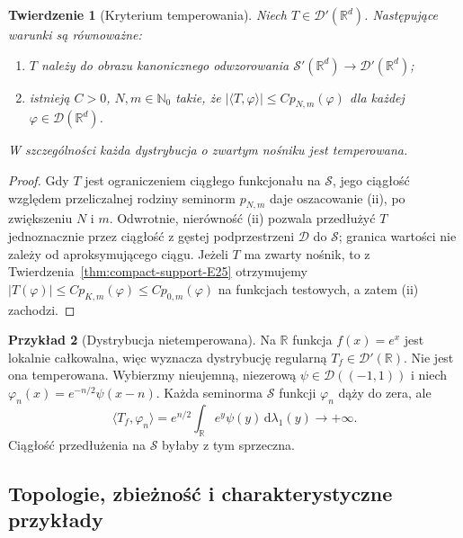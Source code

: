\documentclass[11pt,a4paper]{article}
\numberwithin{equation}{section}
\theoremstyle{plain}
\newtheorem{twierdzenie}{Twierdzenie}[section]
\theoremstyle{definition}
\newtheorem{przyklad}[twierdzenie]{Przykład}
\theoremstyle{remark}
\newcommand{\R}{\mathbb R}
\newcommand{\N}{\mathbb N}
\begin{document}
\begin{twierdzenie}[Kryterium temperowania]
\label{thm:temp-criterion25}
Niech $T\in\mathcal D'(\R^d)$. Następujące warunki są
równoważne:
\begin{enumerate}[label=\textup{(\roman*)}]
\item $T$ należy do obrazu kanonicznego odwzorowania
$\mathcal S'(\R^d)\to\mathcal D'(\R^d)$;
\item istnieją $C>0$, $N,m\in\N_0$ takie, że
$|\langle T,\varphi\rangle|\le C p_{N,m}(\varphi)$
dla każdej $\varphi\in\mathcal D(\R^d)$.
\end{enumerate}
W szczególności każda dystrybucja o zwartym nośniku jest
temperowana.
\end{twierdzenie}
\begin{proof}
Gdy $T$ jest ograniczeniem ciągłego funkcjonału na
$\mathcal S$, jego ciągłość względem przeliczalnej rodziny
seminorm $p_{N,m}$ daje oszacowanie (ii), po zwiększeniu
$N$ i $m$. Odwrotnie, nierówność (ii) pozwala
przedłużyć $T$ jednoznacznie przez ciągłość z gęstej
podprzestrzeni $\mathcal D$ do $\mathcal S$; granica
wartości nie zależy od aproksymującego ciągu.
Jeżeli $T$ ma zwarty nośnik, to z
Twierdzenia~\ref{thm:compact-support-E25} otrzymujemy
$|T(\varphi)|\le C p_{K,m}(\varphi)\le C p_{0,m}(\varphi)$
na funkcjach testowych, a zatem (ii) zachodzi.
\end{proof}

\begin{przyklad}[Dystrybucja nietemperowana]
\label{ex:non-tempered25}
Na $\R$ funkcja $f(x)=e^x$ jest lokalnie całkowalna,
więc wyznacza dystrybucję regularną $T_f\in\mathcal D'(\R)$.
Nie jest ona temperowana. Wybierzmy nieujemną, niezerową
$\psi\in\mathcal D((-1,1))$ i niech
$\varphi_n(x)=e^{-n/2}\psi(x-n)$. Każda seminorma
$\mathcal S$ funkcji $\varphi_n$ dąży do zera, ale
\[
 \langle T_f,\varphi_n\rangle=
 e^{n/2}\int_\R e^y\psi(y)\,\mathrm d\lambda_1(y)
 \longrightarrow+\infty.
\]
Ciągłość przedłużenia na $\mathcal S$ byłaby z tym
sprzeczna.
\end{przyklad}

\subsection{Topologie, zbieżność i charakterystyczne przykłady}
\end{document}
